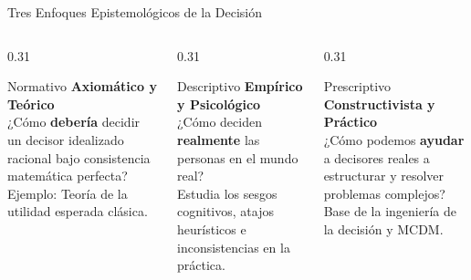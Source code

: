 \documentclass[aspectratio=169, 10pt]{beamer}
\begin{document}
\begin{frame}{Tres Enfoques Epistemológicos de la Decisión}
    \begin{columns}[T]
        \begin{column}{0.31\textwidth}
            \begin{block}{Normativo}
                \scriptsize
                \textbf{Axiomático y Teórico}\\
                ¿Cómo \textbf{debería} decidir un decisor idealizado racional bajo consistencia matemática perfecta?\\
                Ejemplo: Teoría de la utilidad esperada clásica.
            \end{block}
        \end{column}
        
        \begin{column}{0.31\textwidth}
            \begin{alertblock}{Descriptivo}
                \scriptsize
                \textbf{Empírico y Psicológico}\\
                ¿Cómo deciden \textbf{realmente} las personas en el mundo real?\\
                Estudia los sesgos cognitivos, atajos heurísticos e inconsistencias en la práctica.
            \end{alertblock}
        \end{column}
        
        \begin{column}{0.31\textwidth}
            \begin{exampleblock}{Prescriptivo}
                \scriptsize
                \textbf{Constructivista y Práctico}\\
                ¿Cómo podemos \textbf{ayudar} a decisores reales a estructurar y resolver problemas complejos?\\
                Base de la ingeniería de la decisión y MCDM.
            \end{exampleblock}
        \end{column}
    \end{columns}
\end{frame}
\end{document}
